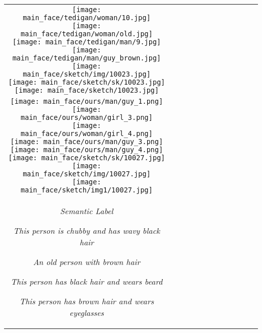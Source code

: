 \documentclass[10pt,twocolumn,letterpaper]{article}
\begin{document}
{\begin{center}
{\begin{tabular}{c c c c c c c c c c c c}
\texttt{[image: main\_face/tedigan/woman/10.jpg]}
\texttt{[image: main\_face/tedigan/woman/old.jpg]}
\hspace{1mm}
\texttt{[image: main\_face/tedigan/man/9.jpg]}
\texttt{[image: main\_face/tedigan/man/guy\_brown.jpg]}
\hspace{4mm}
\texttt{[image: main\_face/sketch/img/10023.jpg]}
\texttt{[image: main\_face/sketch/sk/10023.jpg]}
\texttt{[image: main\_face/sketch/10023.jpg]}
\tabularnewline
\texttt{[image: main\_face/ours/man/guy\_1.png]}
\hspace{2mm}
\raisebox{0.15in}{\rotatebox{90}{\footnotesize OURS}}
\texttt{[image: main\_face/ours/woman/girl\_3.png]}
\texttt{[image: main\_face/ours/woman/girl\_4.png]}
\hspace{1.5mm}
\texttt{[image: main\_face/ours/man/guy\_3.png]}
\texttt{[image: main\_face/ours/man/guy\_4.png]}
\hspace{4mm}
\texttt{[image: main\_face/sketch/sk/10027.jpg]}
\texttt{[image: main\_face/sketch/img/10027.jpg]}
\texttt{[image: main\_face/sketch/img1/10027.jpg]}
\tabularnewline
\begin{minipage}{0.11\linewidth}
\vspace{-20pt}
  \hspace{-2mm}\textit{Semantic Label}
\end{minipage}
\hspace{3mm}
\begin{minipage}{0.11\linewidth}
  \textit{\color{violet}This person is chubby and has wavy black hair}
\end{minipage}
\begin{minipage}{0.11\linewidth}
\vspace{-10pt}
 \textit{\color{orange}An old person with brown hair}
\end{minipage}
\hspace{0.1mm}
\begin{minipage}{0.11\linewidth}
\vspace{0pt}
\textit{\color{violet}This person has black hair and wears beard}
\end{minipage}
\begin{minipage}{0.11\linewidth}
\vspace{0pt}
\textit{\color{orange}This person has brown hair and wears eyeglasses}

\end{minipage}
\end{tabular}}
\end{center}}
\end{document}
